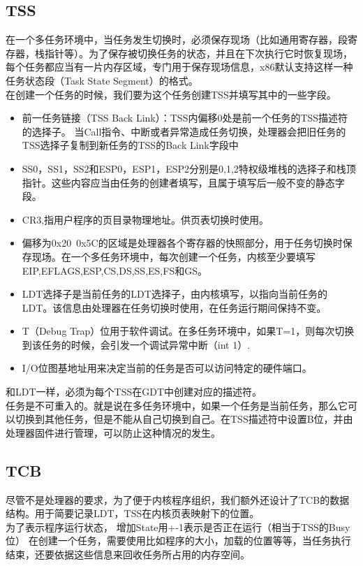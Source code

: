 \documentclass[a4paper,11pt,UTF8]{ctexart}
\begin{document}
	\subsection{TSS}
	在一个多任务环境中，当任务发生切换时，必须保存现场（比如通用寄存器，段寄存器，栈指针等）。为了保存被切换任务的状态，并且在下次执行它时恢复现场，每个任务都应当有一片内存区域，专门用于保存现场信息，x86默认支持这样一种任务状态段（Task State Segment）的格式。\\
	在创建一个任务的时候，我们要为这个任务创建TSS并填写其中的一些字段。\\
	\begin{itemize}
		\item 前一任务链接（TSS Back Link）：TSS内偏移0处是前一个任务的TSS描述符的选择子。 当Call指令、中断或者异常造成任务切换，处理器会把旧任务的TSS选择子复制到新任务的TSS的Back Link字段中
		\item SS0，SS1，SS2和ESP0，ESP1，ESP2分别是0,1,2特权级堆栈的选择子和栈顶指针。这些内容应当由任务的创建者填写，且属于填写后一般不变的静态字段。
		\item CR3,指用户程序的页目录物理地址。供页表切换时使用。
		\item 偏移为0x20~0x5C的区域是处理器各个寄存器的快照部分，用于任务切换时保存现场。在一个多任务环境中，每次创建一个任务，内核至少要填写EIP,EFLAGS,ESP,CS,DS,SS,ES,FS和GS。
		\item LDT选择子是当前任务的LDT选择子，由内核填写，以指向当前任务的LDT。该信息由处理器在任务切换时使用，在任务运行期间保持不变。
		\item T（Debug Trap）位用于软件调试。在多任务环境中，如果T=1，则每次切换到该任务的时候，会引发一个调试异常中断（int 1）.
		\item I/O位图基地址用来决定当前的任务是否可以访问特定的硬件端口。

	\end{itemize}
	和LDT一样，必须为每个TSS在GDT中创建对应的描述符。\\
	任务是不可重入的。就是说在多任务环境中，如果一个任务是当前任务，那么它可以切换到其他任务，但是不能从自己切换到自己。在TSS描述符中设置B位，并由处理器固件进行管理，可以防止这种情况的发生。\\

	\subsection{TCB}
	尽管不是处理器的要求，为了便于内核程序组织，我们额外还设计了TCB的数据结构。用于简要记录LDT，TSS在内核页表映射下的位置。\\
	为了表示程序运行状态， 增加State用+-1表示是否正在运行（相当于TSS的Busy位）
	在创建一个任务，需要使用比如程序的大小，加载的位置等等，当任务执行结束，还要依据这些信息来回收任务所占用的内存空间。\\
\end{document}
